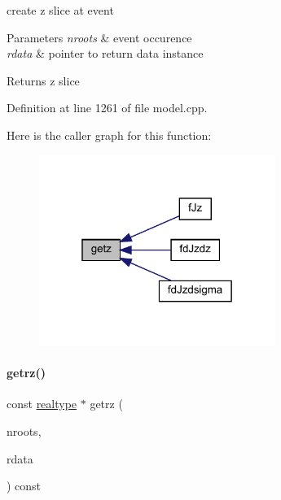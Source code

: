 create z slice at event 
\begin{DoxyParams}{Parameters}
{\em nroots} & event occurence \\
\hline
{\em rdata} & pointer to return data instance \\
\hline
\end{DoxyParams}
\begin{DoxyReturn}{Returns}
z slice 
\end{DoxyReturn}


Definition at line 1261 of file model.\+cpp.

Here is the caller graph for this function\+:
\nopagebreak
\begin{figure}[H]
\begin{center}
\leavevmode
\includegraphics[width=217pt]{classamici_1_1_model_a30571e418f94ca61b8df2b355e46ee1a_icgraph}
\end{center}
\end{figure}
\mbox{\label{classamici_1_1_model_ab2a9be3bb641741a52ddc48fcd9aa143}} 
\paragraph{\texorpdfstring{getrz()}{getrz()}}
{\footnotesize\ttfamily const \mbox{\hyperlink{namespaceamici_a1bdce28051d6a53868f7ccbf5f2c14a3}{realtype}} $\ast$ getrz (\begin{DoxyParamCaption}\item[{const int}]{nroots,  }\item[{const \mbox{\hyperlink{classamici_1_1_return_data}{Return\+Data}} $\ast$}]{rdata }\end{DoxyParamCaption}) const\hspace{0.3cm}{\ttfamily [protected]}}


